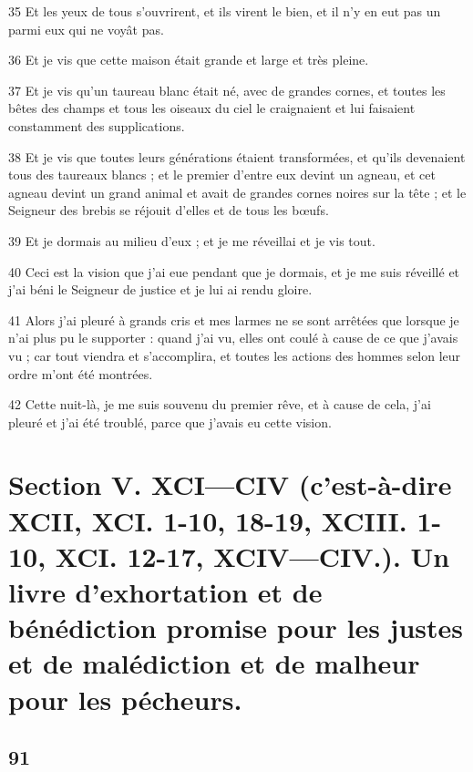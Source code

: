 \par 35 Et les yeux de tous s'ouvrirent, et ils virent le bien, et il n'y en eut pas un parmi eux qui ne voyât pas.
\par 36 Et je vis que cette maison était grande et large et très pleine.
\par 37 Et je vis qu'un taureau blanc était né, avec de grandes cornes, et toutes les bêtes des champs et tous les oiseaux du ciel le craignaient et lui faisaient constamment des supplications.
\par 38 Et je vis que toutes leurs générations étaient transformées, et qu'ils devenaient tous des taureaux blancs ; et le premier d'entre eux devint un agneau, et cet agneau devint un grand animal et avait de grandes cornes noires sur la tête ; et le Seigneur des brebis se réjouit d'elles et de tous les bœufs.
\par 39 Et je dormais au milieu d'eux ; et je me réveillai et je vis tout.
\par 40 Ceci est la vision que j'ai eue pendant que je dormais, et je me suis réveillé et j'ai béni le Seigneur de justice et je lui ai rendu gloire.
\par 41 Alors j'ai pleuré à grands cris et mes larmes ne se sont arrêtées que lorsque je n'ai plus pu le supporter : quand j'ai vu, elles ont coulé à cause de ce que j'avais vu ; car tout viendra et s'accomplira, et toutes les actions des hommes selon leur ordre m'ont été montrées.
\par 42 Cette nuit-là, je me suis souvenu du premier rêve, et à cause de cela, j'ai pleuré et j'ai été troublé, parce que j'avais eu cette vision.

\part{Section V. XCI—CIV (c'est-à-dire XCII, XCI. 1-10, 18-19, XCIII. 1-10, XCI. 12-17, XCIV—CIV.). Un livre d'exhortation et de bénédiction promise pour les justes et de malédiction et de malheur pour les pécheurs.}

\chapter{91}

